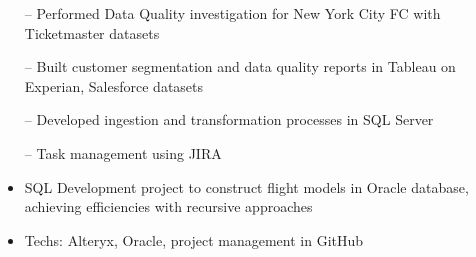 \documentclass[10pt,a4paper]{altacv}
\begin{document}
\medskip




\begin{itemize}
    \setlength{\itemindent}{0.5em}
    \item[--]   \small{Performed Data Quality investigation for New York City FC with Ticketmaster datasets}
    \item[--]   \small{Built customer segmentation and data quality reports in Tableau on Experian, Salesforce datasets}
\end{itemize}

\medskip




\begin{itemize}
    \setlength{\itemindent}{0.5em}
    \item[--]   \small{Developed ingestion and transformation processes in SQL Server}
    \item[--]   \small{Task management using JIRA}
\end{itemize}

\medskip






\begin{itemize}
  \item \small{SQL Development project to construct flight models in Oracle database, achieving efficiencies with recursive approaches}
  \item Techs: Alteryx, Oracle, project management in GitHub
\end{itemize}
\end{document}
